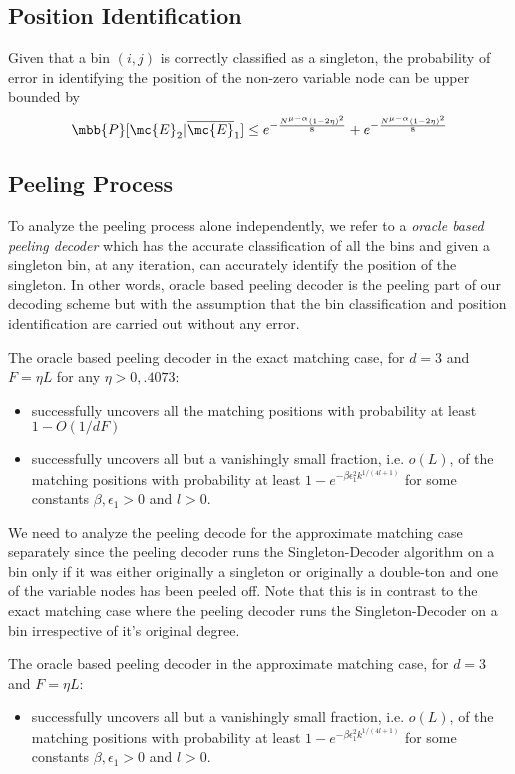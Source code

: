 \subsection{\bf Position Identification}
\begin{lemma}
Given that a bin $(i,j)$ is correctly classified as a singleton, the probability of error in identifying the position of the non-zero variable node can be upper bounded by
\begin{align*}
\mbb{P}[\mc{E}_2|\overline{\mc{E}}_1]\leq e^{-\frac{N^{\mu-\alpha}(1-2\eta)^2}{8}}+e^{-\frac{N^{\mu-\alpha}(1-2\eta)^2}{8}}
\end{align*}
\end{lemma}

\subsection{\bf Peeling Process}
To analyze the peeling process alone independently, we refer to a {\it oracle based peeling decoder} which has the accurate classification of all the bins and given a singleton bin, at any iteration, can accurately identify the position of the singleton. In other words, oracle based peeling decoder is the peeling part of our decoding scheme but with the assumption that the bin classification and position identification are carried out without any error.
\begin{lemma}
The oracle based peeling decoder in the exact matching case, for $d=3$ and $F=\eta L$ for any $\eta>0,.4073$:
\begin{itemize}
\item successfully uncovers all the matching positions with probability at least $1-O(1/dF)$
\item successfully uncovers all but a vanishingly small fraction, i.e. $o(L)$, of the matching positions with probability at least $1-e^{-\beta \epsilon_1^2k^{1/(4l+1)}}$ for some constants $\beta,\epsilon_1>0$ and $l>0.$
\end{itemize}
\end{lemma}

We need to analyze the peeling decode for the approximate matching case separately since the peeling decoder runs the Singleton-Decoder algorithm on a bin only if it was either originally a singleton or originally a double-ton and one of the variable nodes has been peeled off. Note that this is in contrast to the exact matching case where the peeling decoder runs the Singleton-Decoder on a bin irrespective of it's original degree.
\begin{lemma}
The oracle based peeling decoder in the approximate matching case, for $d=3$ and $F=\eta L$:
\begin{itemize}
\item successfully uncovers all but a vanishingly small fraction, i.e. $o(L)$, of the matching positions with probability at least $1-e^{-\beta \epsilon_1^2k^{1/(4l+1)}}$ for some constants $\beta,\epsilon_1>0$ and $l>0.$
\end{itemize}
\end{lemma}
